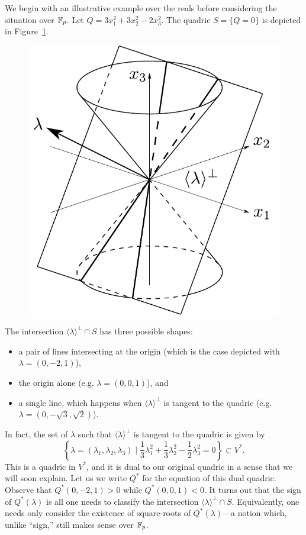 We begin with an illustrative example over the reals before considering the situation over $\mathbb{F}_p$. Let $Q = 3x_1^2 + 3x_2^2 - 2x_3^2$. The quadric $S = \{Q = 0\}$ is depicted in Figure~\ref{fig:conic-with-plane}.
\begin{figure}[h]
	\centering
	\includegraphics[width=0.6\linewidth]{conic-with-plane}
	\caption{}
	\label{fig:conic-with-plane}
\end{figure}
The intersection $\langle \lambda \rangle^\bot \cap S$ has three possible shapes:
\begin{itemize}
	\item a pair of lines intersecting at the origin (which is the case depicted with $\lambda = (0,-2,1)$),
	\item the origin alone (e.g. $\lambda = (0,0,1)$), and
	\item a single line, which happens when $\langle \lambda \rangle^\bot$ is tangent to the quadric (e.g. $\lambda = (0,-\sqrt{3},\sqrt{2})$).
\end{itemize}
In fact, the set of $\lambda$ such that $\langle \lambda \rangle^\bot$ is tangent to the quadric is given by
\[
	\left\{ \lambda = (\lambda_1,\lambda_2,\lambda_3) \mid \frac{1}{3} \lambda_1^2 + \frac{1}{3} \lambda_2^2 - \frac{1}{2} \lambda_3^2 = 0 \right\} \subset V^*.
\]
This is a quadric in $V^*$, and it is dual to our original quadric in a sense that we will soon explain. Let us we write $Q^*$ for the equation of this dual quadric. Observe that $Q^*(0,-2,1) > 0$ while $Q^*(0,0,1) < 0$. It turns out that the sign of $Q^*(\lambda)$ is all one needs to classify the intersection $\langle \lambda \rangle^\bot \cap S$. Equivalently, one needs only consider the existence of square-roots of $Q^*(\lambda)$---a notion which, unlike ``sign,'' still makes sense over $\mathbb{F}_p$.

